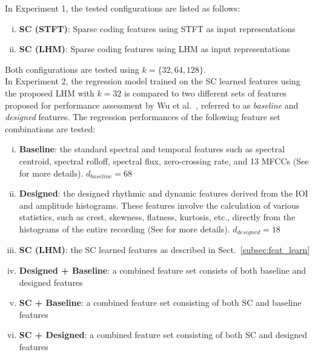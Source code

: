 \documentclass[conference]{IEEEtran}
\begin{document}
In Experiment 1, the tested configurations are listed as follows: %
\begin{enumerate}[(i)]
\item \textbf{SC (STFT)}: Sparse coding features using STFT as input representations
\item \textbf{SC (LHM)}: Sparse coding features using LHM as input representations 
\end{enumerate}
Both configurations are tested using $k = \{32, 64, 128\}$.\\

In Experiment 2, the regression model trained on the SC learned features using the proposed LHM with $k = 32$ is compared to two different sets of features proposed for performance assessment by Wu et al.\ \cite{Wu2016}, referred to as \textit{baseline} and \textit{designed} features. The regression performances of the following feature set combinations are tested:
\begin{enumerate}[(i)]
\item \textbf{Baseline}: the standard spectral and temporal features such as spectral centroid, spectral rolloff, spectral flux, zero-crossing rate, and 13 MFCCs (See \cite{Wu2016} for more details). $d_{baseline} = 68$
\item \textbf{Designed}: the designed rhythmic and dynamic features derived from the IOI and amplitude histograms. These features involve the calculation of various statistics, such as crest, skewness, flatness, kurtosis, etc., directly from the histograms of the entire recording (See \cite{Wu2016} for more details). $d_{designed} = 18$ 

\item \textbf{SC (LHM)}: the SC learned features as described in Sect.~\ref{subsec:feat_learn} %
\item \textbf{Designed + Baseline}: a combined feature set consists of both baseline and designed features %
\item \textbf{SC + Baseline}:  a combined feature set consisting of both SC and baseline features 
\item \textbf{SC + Designed}:  a combined feature set consisting of both SC and designed features 
\end{enumerate}
\end{document}
